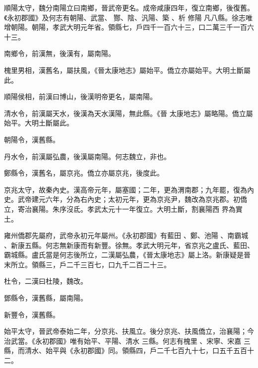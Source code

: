\begin{pinyinscope}
順陽太守，魏分南陽立曰南鄉，晉武帝更名。成帝咸康四年，復立南鄉，後復舊。《永初郡國》及何志有朝陽、武當、
 酂、陰、汎陽、築
 、析
 修陽
 凡八縣。徐志唯增朝陽。朝陽，孝武大明元年省。領縣七，戶四千一百六十三，口二萬三千一百六十三。



 南鄉令，前漢無，後漢有，屬南陽。



 槐里男相，漢舊名，屬扶風，《晉太康地志》屬始平。僑立亦屬始平。大明土斷屬此。



 順陽侯相，前漢曰博山，後漢明帝更名，屬南陽。



 清水令，前漢屬天水，後漢為天水漢陽，無此縣。《晉
 太康地志》屬略陽。僑立屬始平。大明土斷屬此。



 朝陽令，漢舊縣。



 丹水令，前漢屬弘農，後漢屬南陽。何志魏立，非也。



 鄭縣令，漢舊名，屬京兆。僑立亦屬京兆，後度此。



 京兆太守，故秦內史。漢高帝元年，屬塞國；二年，更為渭南郡；九年罷，復為內史。武帝建元六年，分為右內史；太初元年，更為京兆尹，魏改為京兆郡。初僑立，寄治襄陽。朱序沒氐。孝武太元十一年復立。大明土斷，割襄陽西
 界為實土。


雍州僑郡先屬府，武帝永初元年屬州。《永初郡國》有藍田
 、鄭、池陽
 、南霸城
 、新康五縣。何志無新康而有新豐。徐無。孝武大明元年，省京兆之盧氏、藍田、霸城縣。盧氏當是何志後所立，二漢屬弘農，《晉太康地志》屬上洛。新康疑是晉末所立。領縣三，戶二千三百七，口九千二百二十三。



 杜令，二漢曰杜陵，魏改。



 鄧縣令，漢舊縣，屬南陽。



 新豐令，漢舊縣。


始平太守，晉武帝泰始二年，分京兆、扶風立。後分京兆、扶風僑立，治襄陽；今治武當。《永初郡國》唯有始平、平陽、清水
 三縣。何志有槐里
 、宋寧、宋嘉
 三縣，而清水、始平與《永初郡國》同。領縣四，戶二千七百九十七，口五千五百十二。




\end{pinyinscope}
